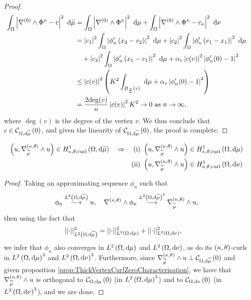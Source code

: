 \begin{proof}
\begin{align*}
		\integral{\ddom}{ \abs{ \grad^{(0)}\wedge\Phi^n - c }^2 }{\dddmes}
		&= \integral{\ddom}{ \abs{ \grad^{(0)}\wedge\Phi^n}^2 }{\ddmes}
		+ \integral{\ddom}{ \abs{ \grad^{(0)}\wedge\Phi^n - c_{\nu} }^2 }{\nu} \\
		&= \abs{c_1}^2\integral{\ddom}{ \abs{\phi'_n\bracs{x_2-v_2}}^2 }{\ddmes}
		+ \abs{c_2}^2\integral{\ddom}{ \abs{\phi'_n\bracs{v_1-x_1}}^2 }{\ddmes} \\
		&\quad + \abs{c_3}^2\integral{\ddom}{ \abs{\phi'_n\bracs{x_1-v_1}}^2 }{\ddmes}
		+ \alpha_v\abs{c(v)}^2\abs{\phi'_n(0)-1}^2 \\
		&\leq \abs{c(v)}^2 \bracs{ K^2\integral{B_{\frac{2}{n}}(v)}{ }{\ddmes}
		+ \alpha_v\abs{\phi'_n(0)-1}^2 } \\
		&= \frac{2\mathrm{deg}(v)}{n}\abs{c(v)}^2 K^2 \rightarrow 0 \toInfty{n},
	\end{align*}
	where $\mathrm{\deg}(v)$ is the degree of the vertex $v$.
	We thus conclude that $c\in\curlZero{\ddom}{\dddmes}$, and given the linearity of $\curlZero{\ddom}{\dddmes}$, the proof is complete.
\end{proof}

\begin{theorem} \label{thm:ThickVertexTangCurlImplication}
	\begin{align*}
		\bracs{u, \ktcurl{\dddmes}u}\in\ktcurlSob{\ddom}{\dddmes}
		\quad\Rightarrow\quad
		\mathrm{(i)} &\ \bracs{u, \ktcurl{\dddmes}u}\in\ktcurlSob{\ddom}{\ddmes} \\
		\mathrm{(ii)} &\ \bracs{u, \ktcurl{\dddmes}u}\in\ktcurlSob{\ddom}{\nu}
	\end{align*}
\end{theorem}
\begin{proof}
	Taking an approximating sequence $\phi_n$ such that
	\begin{align*}
		\phi_n \lconv{\ltwo{\ddom}{\dddmes}} u, \quad \ktcurl{}\phi_n\lconv{\ltwo{\ddom}{\dddmes}^3}\ktcurl{\dddmes}u,
	\end{align*}
	then using the fact that
	\begin{align*}
		\norm{\cdot}_{\ltwo{\ddom}{\dddmes}}^2 &= \norm{\cdot}_{\ltwo{\ddom}{\ddmes}}^2 + \norm{\cdot}_{\ltwo{\ddom}{\nu}}^2,
	\end{align*}
	we infer that $\phi_n$ also converges in $\ltwo{\ddom}{\ddmes}$ and $\ltwo{\ddom}{\nu}$, as do its $\kt$-curls in $\ltwo{\ddom}{\ddmes}^3$ and $\ltwo{\ddom}{\nu}^3$.
	Furthermore, since $\ktcurl{\dddmes}u \perp \curlZero{\ddom}{\dddmes}$ and given proposition \ref{prop:ThickVertexCurlZeroCharacterisation}, we have that $\ktcurl{\dddmes}u$ is orthogonal to $\curlZero{\ddom}{\ddmes}$ (in $\ltwo{\ddom}{\ddmes}^3$) and to $\curlZero{\ddom}{\nu}$ (in $\ltwo{\ddom}{\nu}^3$), and we are done. 
\end{proof}

